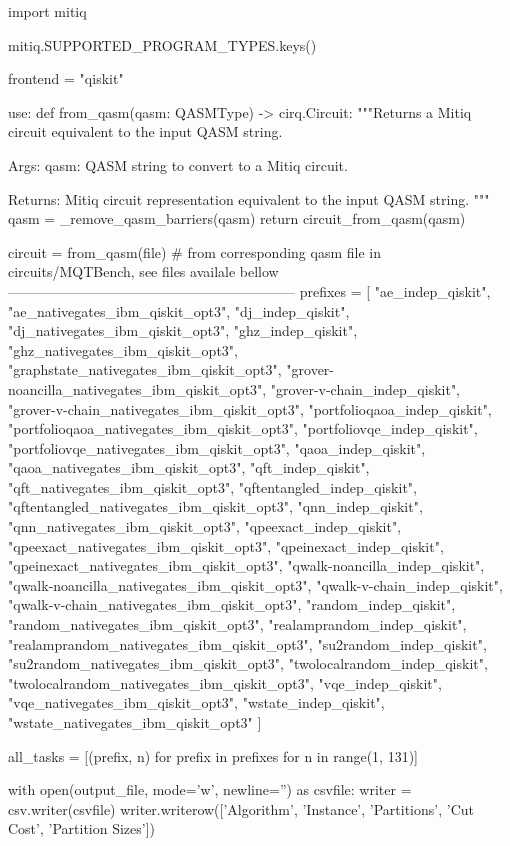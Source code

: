 
import mitiq

mitiq.SUPPORTED_PROGRAM_TYPES.keys()

frontend = "qiskit"


use:
def from_qasm(qasm: QASMType) -> cirq.Circuit:
    """Returns a Mitiq circuit equivalent to the input QASM string.

    Args:
        qasm: QASM string to convert to a Mitiq circuit.

    Returns:
        Mitiq circuit representation equivalent to the input QASM string.
    """
    qasm = _remove_qasm_barriers(qasm)
    return circuit_from_qasm(qasm)

circuit = from_qasm(file) # from corresponding qasm file in circuits/MQTBench, see files availale bellow
--------------------------------------------------------------
prefixes = [
    "ae_indep_qiskit", "ae_nativegates_ibm_qiskit_opt3",
    "dj_indep_qiskit", "dj_nativegates_ibm_qiskit_opt3",
    "ghz_indep_qiskit", "ghz_nativegates_ibm_qiskit_opt3",
    "graphstate_nativegates_ibm_qiskit_opt3",
    "grover-noancilla_nativegates_ibm_qiskit_opt3",
    "grover-v-chain_indep_qiskit", "grover-v-chain_nativegates_ibm_qiskit_opt3",
    "portfolioqaoa_indep_qiskit", "portfolioqaoa_nativegates_ibm_qiskit_opt3",
    "portfoliovqe_indep_qiskit", "portfoliovqe_nativegates_ibm_qiskit_opt3",
    "qaoa_indep_qiskit", "qaoa_nativegates_ibm_qiskit_opt3",
    "qft_indep_qiskit", "qft_nativegates_ibm_qiskit_opt3",
    "qftentangled_indep_qiskit", "qftentangled_nativegates_ibm_qiskit_opt3",
    "qnn_indep_qiskit", "qnn_nativegates_ibm_qiskit_opt3",
    "qpeexact_indep_qiskit", "qpeexact_nativegates_ibm_qiskit_opt3",
    "qpeinexact_indep_qiskit", "qpeinexact_nativegates_ibm_qiskit_opt3",
    "qwalk-noancilla_indep_qiskit", "qwalk-noancilla_nativegates_ibm_qiskit_opt3",
    "qwalk-v-chain_indep_qiskit", "qwalk-v-chain_nativegates_ibm_qiskit_opt3",
    "random_indep_qiskit", "random_nativegates_ibm_qiskit_opt3",
    "realamprandom_indep_qiskit", "realamprandom_nativegates_ibm_qiskit_opt3",
    "su2random_indep_qiskit", "su2random_nativegates_ibm_qiskit_opt3",
    "twolocalrandom_indep_qiskit", "twolocalrandom_nativegates_ibm_qiskit_opt3",
    "vqe_indep_qiskit", "vqe_nativegates_ibm_qiskit_opt3",
    "wstate_indep_qiskit", "wstate_nativegates_ibm_qiskit_opt3"
]

all_tasks = [(prefix, n) for prefix in prefixes for n in range(1, 131)]

with open(output_file, mode='w', newline='') as csvfile:
    writer = csv.writer(csvfile)
    writer.writerow(['Algorithm', 'Instance', 'Partitions', 'Cut Cost', 'Partition Sizes'])

